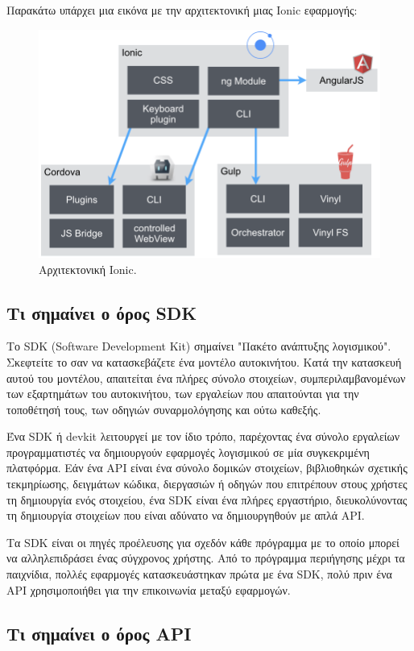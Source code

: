 \documentclass[a4paper,12pt]{article}
\begin{document}
			Παρακάτω υπάρχει μια εικόνα με την αρχιτεκτονική μιας Ionic εφαρμογής:
			\begin{figure}
				\caption{Αρχιτεκτονική Ionic.}
				\vspace*{0.5cm}
				\centering
				\includegraphics[width=0.8\linewidth]{ionic} 
			\end{figure}
		\newpage
		\vspace{1cm}
		\subsection{Τι σημαίνει ο όρος SDK}
			
			Το SDK (Software Development Kit) σημαίνει "Πακέτο ανάπτυξης λογισμικού". Σκεφτείτε το σαν να κατασκεβάζετε ένα μοντέλο αυτοκινήτου. Κατά την κατασκευή αυτού του μοντέλου,
			απαιτείται ένα πλήρες σύνολο στοιχείων, συμπεριλαμβανομένων των εξαρτημάτων του αυτοκινήτου, των εργαλείων που απαιτούνται για την τοποθέτησή τους, των οδηγιών συναρμολόγησης και ούτω
			καθεξής.
			
			Ένα SDK ή devkit λειτουργεί με τον ίδιο τρόπο, παρέχοντας ένα σύνολο εργαλείων
			προγραμματιστές να δημιουργούν εφαρμογές λογισμικού σε μία συγκεκριμένη πλατφόρμα. Εάν ένα API είναι ένα σύνολο δομικών στοιχείων, βιβλιοθηκών σχετικής τεκμηρίωσης, δειγμάτων κώδικα, διεργασιών ή οδηγών που επιτρέπουν στους χρήστες τη δημιουργία ενός στοιχείου,
			ένα SDK είναι ένα πλήρες εργαστήριο, διευκολύνοντας τη δημιουργία στοιχείων που είναι αδύνατο να δημιουργηθούν με απλά API.
			
			Τα SDK είναι οι πηγές προέλευσης για σχεδόν κάθε πρόγραμμα με το οποίο μπορεί να αλληλεπιδράσει ένας σύγχρονος χρήστης. Από το πρόγραμμα περιήγησης μέχρι τα παιχνίδια,
			πολλές εφαρμογές κατασκευάστηκαν πρώτα με ένα SDK, πολύ πριν ένα API χρησιμοποιήθει για την επικοινωνία μεταξύ εφαρμογών.
		\newpage
		\subsection{Τι σημαίνει ο όρος API}
		
\end{document}

